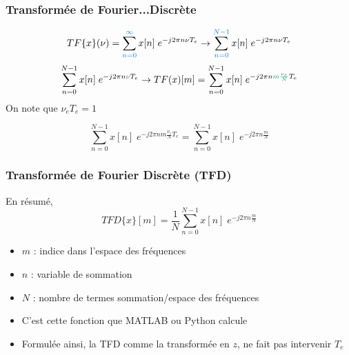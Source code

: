 \documentclass{beamer}
\begin{document}
\begin{frame}
\frametitle{Transformée de Fourier...Discrète}

 \[ TF\{ x \}(\nu) = \sum_{{\color{blue!50!cyan}n = 0}}^{{\color{blue!50!cyan}\infty}} x[n] \; e^{-j 2 \pi n \nu T_e} \rightarrow  \sum_{{\color{blue!50!cyan}n = 0}}^{{\color{blue!50!cyan}N-1}} x[n] \; e^{-j 2 \pi n \nu T_e} \]
\[ \sum_{n = 0}^{N-1} x[n] \; e^{-j 2 \pi n {\color{blue!40!green}\nu} T_e} \rightarrow TF(x)[m] = \sum_{n = 0}^{N-1} x[n] \; e^{-j 2 \pi n {\color{blue!40!green} m \frac{\nu_e}{N}} T_e }  \]
On note que $\nu_e T_e = 1$

 {\[\sum_{n = 0}^{N-1} x[n] \; e^{-j 2 \pi n m \frac{\nu_e}{N} T_e } = \sum_{n = 0}^{N-1} x[n] \; e^{-j 2 \pi n \frac{m}{N} }\]}

\end{frame}



\begin{frame}
\frametitle{Transformée de Fourier Discrète (TFD)}
En résumé,\\
\vspace{0.3cm} 
\[ TFD\{ x \}[m] = \frac{1}{N} \sum_{n = 0}^{N-1} x[n] \; e^{-j 2 \pi n \frac{m}{N}}  \] 
\begin{itemize}
\item $m$ : indice dans l'espace des fréquences
\item $n$ : variable de sommation
\item $N$ : nombre de termes sommation/espace des fréquences
\end{itemize}
\vspace{0.3cm}
\begin{itemize}
\item<2-> C'est cette fonction que MATLAB ou Python calcule
\vspace{0.3cm}
\item<3-> Formulée ainsi, la TFD comme la transformée en $z$, ne fait pas intervenir $T_e$  
\end{itemize}

\end{frame}
\end{document}
